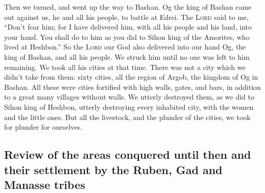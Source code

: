  Then we turned, and went up the way to Bashan. Og the
king of Bashan came out against us, he and all his people, to battle at
Edrei.  The \textsc{Lord} said to me, ``Don't fear him;
for I have delivered him, with all his people and his land, into your
hand. You shall do to him as you did to Sihon king of the Amorites, who
lived at Heshbon.''  So the \textsc{Lord} our God also
delivered into our hand Og, the king of Bashan, and all his people. We
struck him until no one was left to him remaining.  We
took all his cities at that time. There was not a city which we didn't
take from them: sixty cities, all the region of Argob, the kingdom of Og
in Bashan.  All these were cities fortified with high
walls, gates, and bars, in addition to a great many villages without
walls.  We utterly destroyed them, as we did to Sihon king
of Heshbon, utterly destroying every inhabited city, with the women and
the little ones.  But all the livestock, and the plunder
of the cities, we took for plunder for ourselves.

\hypertarget{review-of-the-areas-conquered-until-then-and-their-settlement-by-the-ruben-gad-and-manasse-tribes}{%
\subsection{Review of the areas conquered until then and their
settlement by the Ruben, Gad and Manasse
tribes}\label{review-of-the-areas-conquered-until-then-and-their-settlement-by-the-ruben-gad-and-manasse-tribes}}

